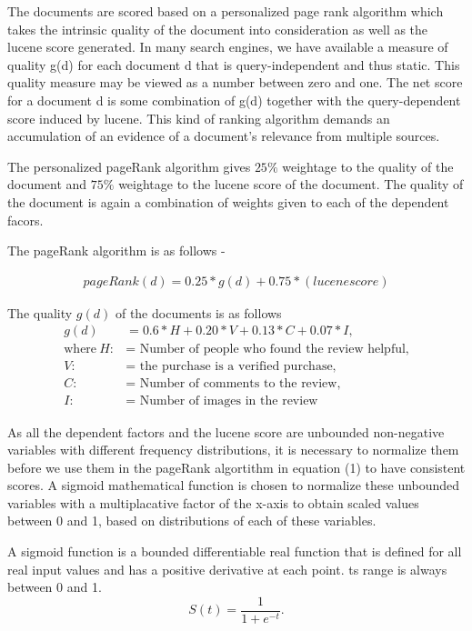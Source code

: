 \documentclass{article}
\begin{document}
The documents are scored based on a personalized page rank algorithm which takes the intrinsic quality of the document into consideration as well as the lucene score generated. In many search engines, we have available a measure of quality g(d) for each document d that is query-independent and thus static. This quality measure may be viewed as a number between zero and one. The net score for a document d is some combination of g(d) together with the query-dependent score induced by lucene. This kind of ranking algorithm demands an accumulation of an evidence of a document's relevance from multiple sources. 

The personalized pageRank algorithm gives $25\%$ weightage to the quality of the document and $75\%$ weightage to the lucene score of the document. The quality of the document is again a combination of weights given to each of the dependent facors.  

The pageRank algorithm is as follows - 

\begin{align}
pageRank(d) = 0.25 * g(d) + 0.75 * (lucene score)
\end{align}

The quality $g(d)$ of the documents is as follows 
\begin{align*}
g(d) &= 0.6 * H  + 0.20 * V + 0.13 * C + 0.07 * I, \\
 \text{where}~H: &= \text{ Number of people who found the review helpful,} \\
 V: &= \text{ the purchase is a verified purchase,} \\
 C: &= \text{ Number of comments to the review,} \\
 I: &= \text{ Number of images in the review}
\end{align*}

As all the dependent factors and the lucene score are unbounded non-negative variables with different frequency distributions, it is necessary to normalize them before we use them in the pageRank algortithm in equation (1) to have consistent scores. A sigmoid mathematical function is chosen to normalize these unbounded variables with a multiplacative factor of the x-axis to obtain scaled values between 0 and 1, based on distributions of each of these variables. 

A sigmoid function is a bounded differentiable real function that is defined for all real input values and has a positive derivative at each point. 
ts range is always between 0 and 1. 
\begin{equation}
S(t) = \frac{1}{1 + e^{-t}}.
\end{equation}
\end{document}
